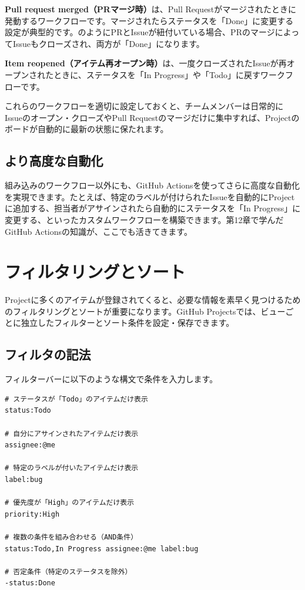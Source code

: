 \textbf{Pull request merged（PRマージ時）}は、Pull Requestがマージされたときに発動するワークフローです。マージされたらステータスを「Done」に変更する設定が典型的です。のようにPRとIssueが紐付いている場合、PRのマージによってIssueもクローズされ、両方が「Done」になります。

\textbf{Item reopened（アイテム再オープン時）}は、一度クローズされたIssueが再オープンされたときに、ステータスを「In Progress」や「Todo」に戻すワークフローです。

これらのワークフローを適切に設定しておくと、チームメンバーは日常的にIssueのオープン・クローズやPull Requestのマージだけに集中すれば、Projectのボードが自動的に最新の状態に保たれます。

\subsection{より高度な自動化}

組み込みのワークフロー以外にも、GitHub Actionsを使ってさらに高度な自動化を実現できます。たとえば、特定のラベルが付けられたIssueを自動的にProjectに追加する、担当者がアサインされたら自動的にステータスを「In Progress」に変更する、といったカスタムワークフローを構築できます。第12章で学んだGitHub Actionsの知識が、ここでも活きてきます。

\section{フィルタリングとソート}

Projectに多くのアイテムが登録されてくると、必要な情報を素早く見つけるためのフィルタリングとソートが重要になります。GitHub Projectsでは、ビューごとに独立したフィルターとソート条件を設定・保存できます。

\subsection{フィルタの記法}

フィルターバーに以下のような構文で条件を入力します。

\begin{lstlisting}[language={}]
# ステータスが「Todo」のアイテムだけ表示
status:Todo

# 自分にアサインされたアイテムだけ表示
assignee:@me

# 特定のラベルが付いたアイテムだけ表示
label:bug

# 優先度が「High」のアイテムだけ表示
priority:High

# 複数の条件を組み合わせる（AND条件）
status:Todo,In Progress assignee:@me label:bug

# 否定条件（特定のステータスを除外）
-status:Done
\end{lstlisting}

